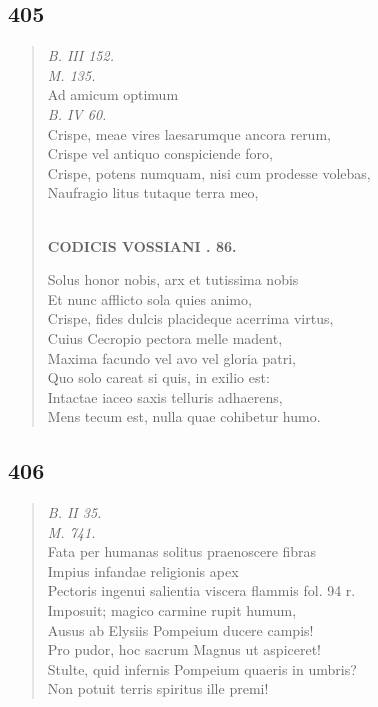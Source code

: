 \documentclass[11pt, a4paper]{report}
\begin{document}
            \subsection*{405}
      \begin{verse}
      \textit{B. III 152.} \\ \textit{M. 135.} \\ Ad amicum optimum \\ \textit{B. IV 60.} \\ Crispe, meae vires laesarumque ancora rerum, \\ Crispe vel antiquo conspiciende foro, \\ Crispe, potens numquam, nisi cum prodesse volebas, \\ Naufragio litus tutaque terra meo, \\ 
        ﻿\pagebreak 
    \begin{center} \textbf{CODICIS VOSSIANI . 86.} \end{center} \marginpar{[315]} Solus honor nobis, arx et tutissima nobis \\ Et nunc afflicto sola quies animo, \\ Crispe, fides dulcis placideque acerrima virtus, \\ Cuius Cecropio pectora melle madent, \\ Maxima facundo vel avo vel gloria patri, \\ Quo solo careat si quis, in exilio est: \\ Intactae iaceo saxis telluris adhaerens, \\ Mens tecum est, nulla quae cohibetur humo. \\ 
      \end{verse}
  
            \subsection*{406}
      \begin{verse}
      \textit{B. II 35.} \\ \textit{M. 741.} \\ Fata per humanas solitus praenoscere fibras \\ Impius infandae religionis apex \\ Pectoris ingenui salientia viscera flammis fol. 94 r. \\ Imposuit; magico carmine rupit humum, \\ Ausus ab Elysiis Pompeium ducere campis! \\ Pro pudor, hoc sacrum Magnus ut aspiceret! \\ Stulte, quid infernis Pompeium quaeris in umbris? \\ Non potuit terris spiritus ille premi! \\ 
      \end{verse}
  
\end{document}
